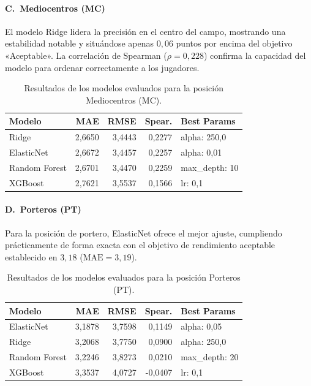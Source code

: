 \paragraph{C.\ Mediocentros (MC)}

El modelo Ridge lidera la precisión en el centro del campo, mostrando
una estabilidad notable y situándose apenas $0{,}06$ puntos por encima
del objetivo «Aceptable». La correlación de Spearman ($\rho = 0{,}228$)
confirma la capacidad del modelo para ordenar correctamente a los
jugadores.

\begin{table}[H]
\centering
\small
\begin{tabular}{|l|r|r|r|p{3.2cm}|}
\hline
\textbf{Modelo} & \textbf{MAE} & \textbf{RMSE} & \textbf{Spear.} &
\textbf{Best Params} \\
\hline
Ridge         & 2{,}6650 & 3{,}4443 & 0{,}2277 & alpha: 250{,}0 \\
ElasticNet    & 2{,}6672 & 3{,}4457 & 0{,}2257 & alpha: 0{,}01  \\
Random Forest & 2{,}6701 & 3{,}4470 & 0{,}2259 & max\_depth: 10 \\
XGBoost       & 2{,}7621 & 3{,}5537 & 0{,}1566 & lr: 0{,}1      \\
\hline
\end{tabular}
\caption{Resultados de los modelos evaluados para la posición Mediocentros (MC).}
\label{tab:resultados_mc}
\end{table}

\paragraph{D.\ Porteros (PT)}

Para la posición de portero, ElasticNet ofrece el mejor ajuste,
cumpliendo prácticamente de forma exacta con el objetivo de rendimiento
aceptable establecido en $3{,}18$ ($\mathrm{MAE} = 3{,}19$).

\begin{table}[H]
\centering
\small
\begin{tabular}{|l|r|r|r|p{3.2cm}|}
\hline
\textbf{Modelo} & \textbf{MAE} & \textbf{RMSE} & \textbf{Spear.} &
\textbf{Best Params} \\
\hline
ElasticNet    & 3{,}1878 & 3{,}7598 & 0{,}1149 &  alpha: 0{,}05  \\
Ridge         & 3{,}2068 & 3{,}7750 & 0{,}0900 &  alpha: 250{,}0 \\
Random Forest & 3{,}2246 & 3{,}8273 & 0{,}0210 &  max\_depth: 20 \\
XGBoost       & 3{,}3537 & 4{,}0727 & -0{,}0407 & lr: 0{,}1      \\
\hline
\end{tabular}
\caption{Resultados de los modelos evaluados para la posición Porteros (PT).}
\label{tab:resultados_pt}
\end{table}

